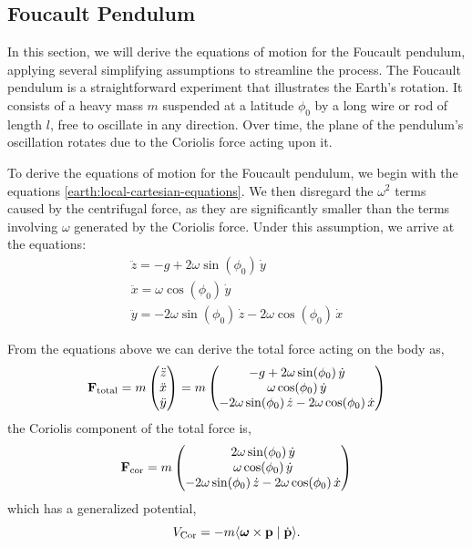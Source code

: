\documentclass[12pt]{article}
\newcommand{\ip}[2]{\langle #1 \mid #2 \rangle}
\begin{document}
\subsection{Foucault Pendulum}

In this section, we will derive the equations of motion for the Foucault pendulum, applying
several simplifying assumptions to streamline the process. The Foucault pendulum is a
straightforward experiment that illustrates the Earth's rotation. It consists of a heavy mass
$m$ suspended at a latitude $\phi_0$ by a long wire or rod of length $l$, free to oscillate
in any direction. Over time, the plane of the pendulum's oscillation rotates due to the
Coriolis force acting upon it.

To derive the equations of motion for the Foucault pendulum, we begin with the equations
\eqref{earth:local-cartesian-equations}. We then disregard the $\omega^2$ terms caused by the
centrifugal force, as they are significantly smaller than the terms involving $\omega$
generated by the Coriolis force. Under this assumption, we arrive at the equations:
\begin{equation}
  \begin{gathered}
    \ddot{z} = -g + 2\omega\sin(\phi_0)\,\dot{y} \\
    \ddot{x} = \omega\cos(\phi_0)\,\dot{y} \\
    \ddot{y} = -2\omega\sin(\phi_0)\,\dot{z} - 2\omega\cos(\phi_0)\,\dot{x}
  \end{gathered}
\end{equation}

From the equations above we can derive the total force acting on the body as,
\begin{equation}
  \vb{F}_\text{total} = m
  \begin{pmatrix} \ddot{z} \\ \ddot{x} \\ \ddot{y} \end{pmatrix}
  = m
  \begin{pmatrix}
    -g + 2\omega\sin(\phi_0)\,\dot{y} \\
    \omega\cos(\phi_0)\,\dot{y} \\
    -2\omega\sin(\phi_0)\,\dot{z} - 2\omega\cos(\phi_0)\,\dot{x}
  \end{pmatrix}
\end{equation}
the Coriolis component of the total force is,
\begin{equation}
  \vb{F}_\text{cor} = m
  \begin{pmatrix}
    2\omega\sin(\phi_0)\,\dot{y} \\
    \omega\cos(\phi_0)\,\dot{y} \\
    -2\omega\sin(\phi_0)\,\dot{z} - 2\omega\cos(\phi_0)\,\dot{x}
  \end{pmatrix}
\end{equation}
which has a generalized potential,
\begin{equation}
  V_\text{Cor} = -m\ip{\boldsymbol{\omega}\times\vb{p}}{\dot{\vb{p}}}.
\end{equation}
\end{document}
